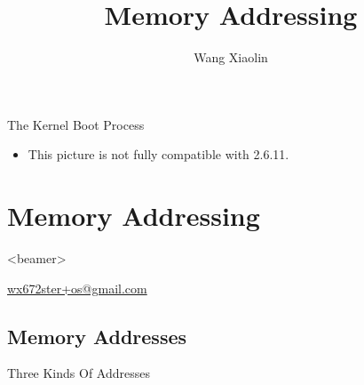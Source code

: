 \begin{frame}{The Kernel Boot Process}
  \begin{center}
  \end{center}
\end{frame}

\begin{itemize}
\item This picture is not fully compatible with 2.6.11.
\end{itemize}




\section{Memory Addressing}

\begin{frame}<beamer>
  \title{Memory Addressing}
  \author{Wang Xiaolin}
  \titlepage
  \vfill
  {\small{} \url{wx672ster+os@gmail.com}}
\end{frame}

\subsection{Memory Addresses}

\begin{frame}{Three Kinds Of Addresses}
  \begin{center}
  \end{center}
\end{frame}


